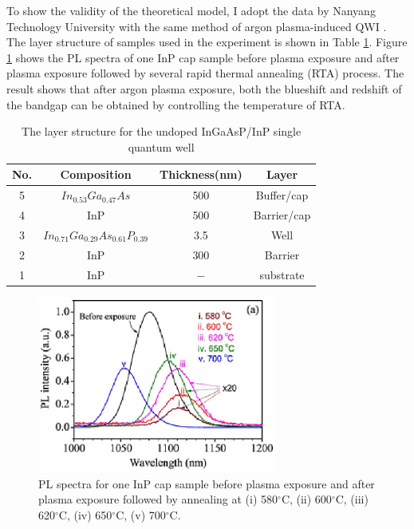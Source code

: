 \documentclass{ZJUthesis}
\begin{document}
To show the validity of the theoretical model, I adopt the data by Nanyang Technology University with the same method of argon plasma-induced QWI \cite{redshift}. The layer structure of samples used in the experiment is shown in Table \ref{RedShiftSample}. Figure \ref{ex_redshift} shows the PL spectra of one InP cap sample before plasma exposure and after plasma exposure followed by several rapid thermal annealing (RTA) process. The result shows that after argon plasma exposure, both the blueshift and redshift of the bandgap can be obtained by controlling the temperature of RTA.

\begin{table}[!t]
    \caption{The layer structure for the undoped InGaAsP/InP single quantum well}
    \centering
    \label{RedShiftSample}
    \begin{tabular}{cccc}
        \hline
        \hline
        No. & Composition & Thickness(nm) & Layer\\
        \hline
        5 & $In_{0.53}Ga_{0.47}As$ & 500 & Buffer/cap\\
        4 & InP & 500 & Barrier/cap\\
        3 & $In_{0.71}Ga_{0.29}As_{0.61}P_{0.39}$ & 3.5 & Well\\
        2 & InP & 300 & Barrier\\
        1 & InP & $-$ & substrate\\
        \hline
        \hline
    \end{tabular}
\end{table}

\begin{figure}[!t]
    \centering
    \includegraphics[width=0.7\textwidth]{./Pictures/exp_red.eps}
    \caption{PL spectra for one InP cap sample before plasma exposure and after plasma exposure followed by annealing at (i) 580$^\circ$C, (ii) 600$^\circ$C, (iii) 620$^\circ$C, (iv) 650$^\circ$C, (v) 700$^\circ$C.}
    \label{ex_redshift}
\end{figure}
\end{document}
